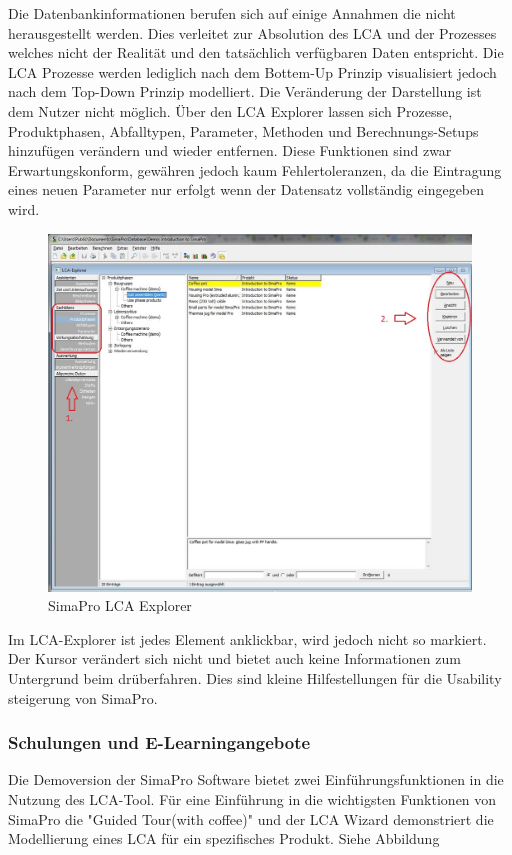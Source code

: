 \documentclass[a4paper, 12pt, twoside, BCOR=20mm, DIV=calc, abstracton, parskip=half*, toc=bibliography, toc=listof, headsepline, footsepline, headings=small, numbers=enddot]{scrreprt}
\begin{document}
Die Datenbankinformationen berufen sich auf einige Annahmen die nicht herausgestellt werden. Dies verleitet zur Absolution des \ac{LCA} und der Prozesses welches nicht der Realität und den tatsächlich verfügbaren Daten entspricht. 
Die \ac{LCA} Prozesse werden lediglich nach dem Bottem-Up Prinzip visualisiert jedoch nach dem Top-Down Prinzip modelliert. Die Veränderung der Darstellung ist dem Nutzer nicht möglich.
Über den LCA Explorer lassen sich Prozesse, Produktphasen, Abfalltypen, Parameter, Methoden und Berechnungs-Setups hinzufügen verändern und wieder entfernen. Diese Funktionen sind zwar Erwartungskonform, gewähren jedoch kaum Fehlertoleranzen, da die Eintragung eines neuen Parameter nur erfolgt wenn der Datensatz vollständig eingegeben wird. 
\begin{figure}
\centering
\includegraphics[width=\textwidth]{Bild/Sima Pro Coffee Prozesse.JPG}
\caption{SimaPro LCA Explorer}
\end{figure}
Im LCA-Explorer ist jedes Element anklickbar, wird jedoch nicht so markiert. Der Kursor verändert sich nicht und bietet auch keine Informationen zum Untergrund beim drüberfahren. Dies sind kleine Hilfestellungen für die Usability steigerung von SimaPro.  

\subsubsection{Schulungen und E-Learningangebote}
Die Demoversion der SimaPro Software bietet zwei Einführungsfunktionen in die Nutzung des \ac{LCA}-Tool. Für eine Einführung in die wichtigsten Funktionen von SimaPro die "Guided Tour(with coffee)" und der LCA Wizard demonstriert die Modellierung eines \ac{LCA} für ein spezifisches Produkt. Siehe Abbildung 
\end{document}
